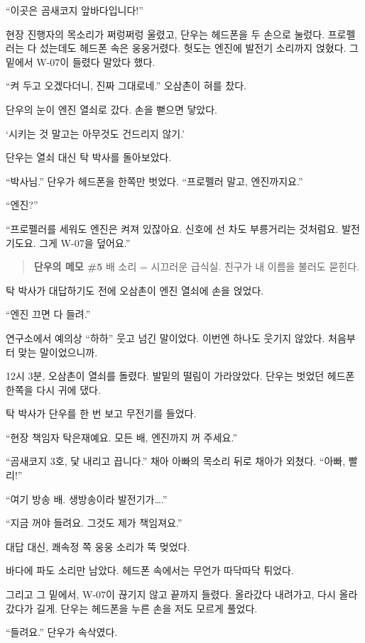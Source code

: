 \documentclass[
  korean,
  letterpaper,
  twoside,
  open=any,
  fontsize=12.5pt,
  headings=small]{scrbook}
\begin{document}
``이곳은 곰새코지
앞바다입니다!''

현장 진행자의 목소리가
쩌렁쩌렁 울렸고, 단우는
헤드폰을 두 손으로 눌렀다.
프로펠러는 다 섰는데도 헤드폰
속은 웅웅거렸다. 헛도는 엔진에
발전기 소리까지 얹혔다. 그
밑에서 W-07이 들렸다 말았다
했다.

``켜 두고 오겠다더니, 진짜
그대로네.'' 오삼촌이 혀를
찼다.

단우의 눈이 엔진 열쇠로 갔다.
손을 뻗으면 닿았다.

`시키는 것 말고는 아무것도
건드리지 않기.'

단우는 열쇠 대신 탁 박사를
돌아보았다.

``박사님.'' 단우가 헤드폰을
한쪽만 벗었다. ``프로펠러
말고, 엔진까지요.''

``엔진?''

``프로펠러를 세워도 엔진은
켜져 있잖아요. 신호에 선 차도
부릉거리는 것처럼요.
발전기도요. 그게 W-07을
덮어요.''

\begin{quote}
\textbf{단우의 메모 \#5} 배
소리 = 시끄러운 급식실. 친구가
내 이름을 불러도 묻힌다.
\end{quote}

탁 박사가 대답하기도 전에
오삼촌이 엔진 열쇠에 손을
얹었다.

``엔진 끄면 다 들려.''

연구소에서 예의상 ``하하''
웃고 넘긴 말이었다. 이번엔
하나도 웃기지 않았다. 처음부터
맞는 말이었으니까.

12시 3분, 오삼촌이 열쇠를
돌렸다. 발밑의 떨림이
가라앉았다. 단우는 벗었던
헤드폰 한쪽을 다시 귀에 댔다.

탁 박사가 단우를 한 번 보고
무전기를 들었다.

``현장 책임자 탁은재예요. 모든
배, 엔진까지 꺼 주세요.''

``곰새코지 3호, 닻 내리고
끕니다.'' 채아 아빠의 목소리
뒤로 채아가 외쳤다. ``아빠,
빨리!''

``여기 방송 배. 생방송이라
발전기가\ldots.''

``지금 꺼야 들려요. 그것도
제가 책임져요.''

대답 대신, 쾌속정 쪽 웅웅
소리가 뚝 멎었다.

바다에 파도 소리만 남았다.
헤드폰 속에서는 무언가
따닥따닥 튀었다.

그리고 그 밑에서, W-07이
끊기지 않고 끝까지 들렸다.
올라갔다 내려가고, 다시
올라갔다가 길게. 단우는
헤드폰을 누른 손을 저도 모르게
풀었다.

``들려요.'' 단우가 속삭였다.
\end{document}
